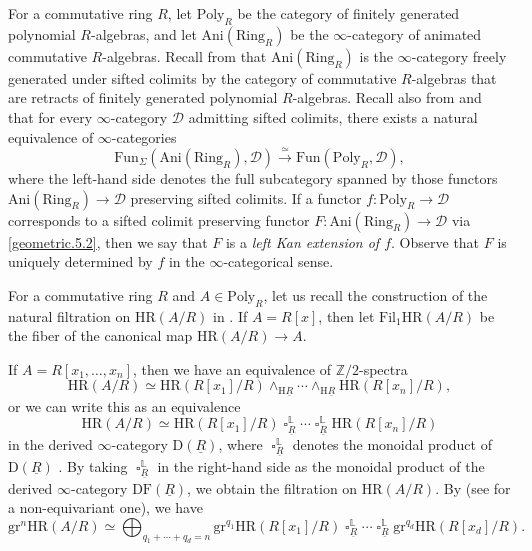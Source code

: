 \documentclass[10pt]{amsart}
\theoremstyle{definition}
\numberwithin{equation}{section}
\renewcommand{\L}{\mathbb{L}}
\newcommand{\Z}{\mathbb{Z}}
\newcommand{\cD}{\mathcal{D}}
\newcommand{\rD}{\mathrm{D}}
\newcommand{\rH}{\mathrm{H}}
\newcommand{\ul}{\underline}
\newcommand{\Ani}{\mathrm{Ani}}
\newcommand{\Ring}{\mathrm{Ring}}
\newcommand{\Fun}{\mathrm{Fun}}
\newcommand{\Poly}{\mathrm{Poly}}
\newcommand{\DF}{\mathrm{DF}}
\newcommand{\gr}{\mathrm{gr}}
\newcommand{\Fil}{\mathrm{Fil}}
\DeclareMathOperator{\sotimes}{\square}
\newcommand{\HR}{\mathrm{HR}}
\begin{document}
{For a commutative ring $R$,
let $\Poly_R$ be the category of finitely generated polynomial $R$-algebras,
and let $\Ani(\Ring_R)$ be the $\infty$-category of animated commutative $R$-algebras.
Recall from \cite[Example 5.1.3, 5.1.4]{CS24} that $\Ani(\Ring_R)$ is the $\infty$-category freely generated under sifted colimits by the category of commutative $R$-algebras that are retracts of finitely generated polynomial $R$-algebras.
Recall also from \cite[Construction 2.1]{BMS19} and \cite[Proposition 5.5.8.15]{HTT} that for every $\infty$-category $\cD$ admitting sifted colimits,
there exists a natural equivalence of $\infty$-categories
\begin{equation}
\label{geometric.5.2}
\Fun_\Sigma(\Ani(\Ring_R),\cD)
\xrightarrow{\simeq}
\Fun(\Poly_R,\cD),
\end{equation}
where the left-hand side denotes the full subcategory spanned by those functors $\Ani(\Ring_R)\to \cD$ preserving sifted colimits.
If a functor $f\colon \Poly_R\to \cD$ corresponds to a sifted colimit preserving functor $F\colon \Ani(\Ring_R)\to \cD$ via \eqref{geometric.5.2},
then we say that $F$ is a \emph{left Kan extension of $f$}.
Observe that $F$ is uniquely determined by $f$ in the $\infty$-categorical sense.

For a commutative ring $R$ and $A\in \Poly_R$,
let us recall the construction of the natural filtration on $\HR(A/R)$ in \cite[Theorem 4.32]{HP}.
If $A=R[x]$,
then let $\Fil_1\HR(A/R)$ be the fiber of the canonical map $\HR(A/R)\to A$.

If $A=R[x_1,\ldots,x_n]$,
then we have an equivalence of $\Z/2$-spectra
\[
\HR(A/R)
\simeq
\HR(R[x_1]/R)\wedge_{\rH \ul{R}} 
\cdots \wedge_{\rH \ul{R}}  \HR(R[x_n]/R),
\]
or we can write this as an equivalence
\begin{equation}
\label{geometric.5.3}
\HR(A/R)
\simeq
\HR(R[x_1]/R)\sotimes_{\ul{R}}^\L
\cdots
\sotimes_{\ul{R}}^\L \HR(R[x_n]/R)
\end{equation}
in the derived $\infty$-category $\rD(\ul{R})$,
where $\sotimes_{\ul{R}}^\L$ denotes the monoidal product of $\rD(\ul{R})$ \cite[Recollection 2.2]{HP}.
By taking $\sotimes_{\ul{R}}^\L$ in the right-hand side as the monoidal product of the derived $\infty$-category $\DF(\ul{R})$,
we obtain the filtration on $\HR(A/R)$.
By \cite{GP18} (see \cite[Lemma 5.2(5)]{BMS19} for a non-equivariant one),
we have
\begin{equation}
\label{geometric.5.1}
\gr^n\HR(A/R)
\simeq
\bigoplus_{q_1+\cdots+q_d=n}
\gr^{q_1}\HR(R[x_1]/R)\sotimes_{\ul{R}}^\L\cdots \sotimes_{\ul{R}}^\L\gr^{q_d}\HR(R[x_d]/R).
\end{equation}


}
\end{document}
